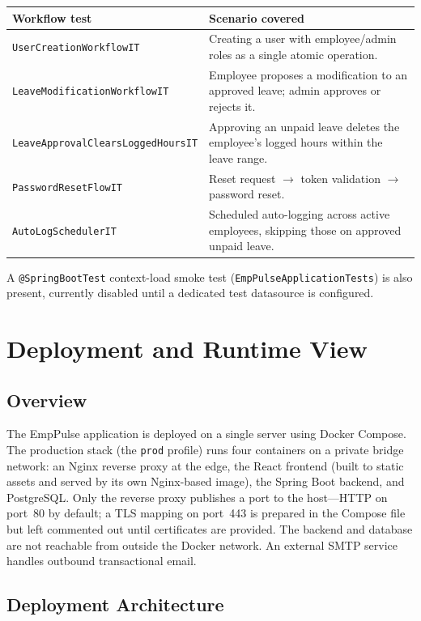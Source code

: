 \documentclass[11pt,a4paper]{article}
\begin{document}
\begin{longtable}{p{6cm} p{7.5cm}}
\toprule
\textbf{Workflow test} & \textbf{Scenario covered} \\
\midrule
\endhead
\texttt{UserCreationWorkflowIT} & Creating a user with employee/admin roles as a single atomic operation. \\
\texttt{LeaveModificationWorkflowIT} & Employee proposes a modification to an approved leave; admin approves or rejects it. \\
\texttt{LeaveApprovalClearsLoggedHoursIT} & Approving an unpaid leave deletes the employee's logged hours within the leave range. \\
\texttt{PasswordResetFlowIT} & Reset request $\rightarrow$ token validation $\rightarrow$ password reset. \\
\texttt{AutoLogSchedulerIT} & Scheduled auto-logging across active employees, skipping those on approved unpaid leave. \\
\bottomrule
\end{longtable}

\noindent A \texttt{@SpringBootTest} context-load smoke test (\texttt{EmpPulseApplicationTests}) is
also present, currently disabled until a dedicated test datasource is configured.

\section{Deployment and Runtime View}
\label{sec:deployment}

\subsection{Overview}

The EmpPulse application is deployed on a single server using Docker Compose. The production stack (the \texttt{prod} profile) runs four containers on a private bridge network: an Nginx reverse proxy at the edge, the React frontend (built to static assets and served by its own Nginx-based image), the Spring Boot backend, and PostgreSQL. Only the reverse proxy publishes a port to the host---HTTP on port~80 by default; a TLS mapping on port~443 is prepared in the Compose file but left commented out until certificates are provided. The backend and database are not reachable from outside the Docker network. An external SMTP service handles outbound transactional email.

\subsection{Deployment Architecture}
\end{document}
